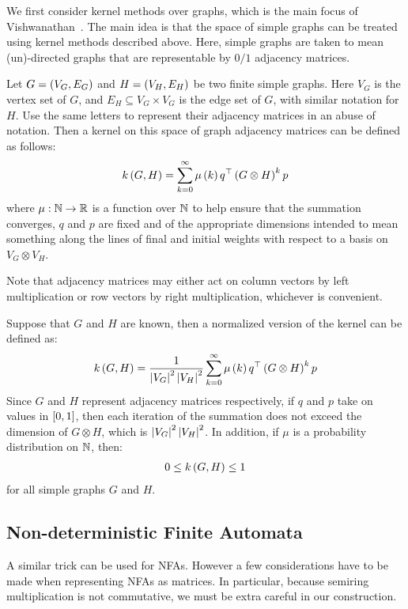 \documentclass[12pt]{article}
\begin{document}
We first consider kernel methods over graphs, which is the main focus
of Vishwanathan~\cite{vishwanathan2010graph}.
The main idea is that the space of simple graphs can be treated
using kernel methods described above.
Here, simple graphs are taken to mean (un)-directed graphs
that are representable by \(0 / 1\) adjacency matrices.

Let \(G = \left(V_G, E_G\right)\) and
\(H = \left(V_H, E_H\right)\) be two finite simple graphs.
Here \(V_G\) is the vertex set of \(G\), and \(E_H \subseteq V_G \times V_G\)
is the edge set of \(G\), with similar notation for \(H\).
Use the same letters to represent their adjacency matrices in an abuse
of notation.
Then a kernel on this space of graph adjacency matrices can be
defined as follows:
\begin{align}
  k\left(G, H\right)
    = \sum_{k = 0}^{\infty} \mu\left(k\right) q^\top \left(G \otimes H\right)^k p
\end{align}
where \(\mu : \mathbb{N} \to \mathbb{R}\) is a function over \(\mathbb{N}\)
to help ensure that the summation converges,
\(q\) and \(p\) are fixed and of the appropriate dimensions
intended to mean something along the lines of final
and initial weights with respect to a basis on \(V_G \otimes V_H\).

Note that adjacency matrices may either act on column vectors by
left multiplication or row vectors by right multiplication,
whichever is convenient.

Suppose that \(G\) and \(H\) are known,
then a normalized version of the kernel can be defined as:
\begin{align}
  k\left(G, H\right)
    = \frac{1}{\left\lvert V_G\right\rvert^2 \left\lvert V_H\right\rvert^2}
      \sum_{k = 0}^{\infty} \mu\left(k\right) q^\top \left(G \otimes H\right)^k p
\end{align}
Since \(G\) and \(H\) represent adjacency matrices respectively,
if \(q\) and \(p\) take on values in \(\left[0, 1\right]\),
then each iteration of the summation does not exceed the dimension
of \(G \otimes H\),
which is \(\left\lvert V_G\right\rvert^2 \left\lvert V_H\right\rvert^2\).
In addition, if \(\mu\) is a probability distribution on \(\mathbb{N}\), then:
\begin{align}
  0 \leq k\left(G, H\right) \leq 1
\end{align}
for all simple graphs \(G\) and \(H\).





\subsection{Non-deterministic Finite Automata}
A similar trick can be used for NFAs.
However a few considerations have to be made when representing NFAs
as matrices.
In particular, because semiring multiplication is not commutative,
we must be extra careful in our construction.
\end{document}

